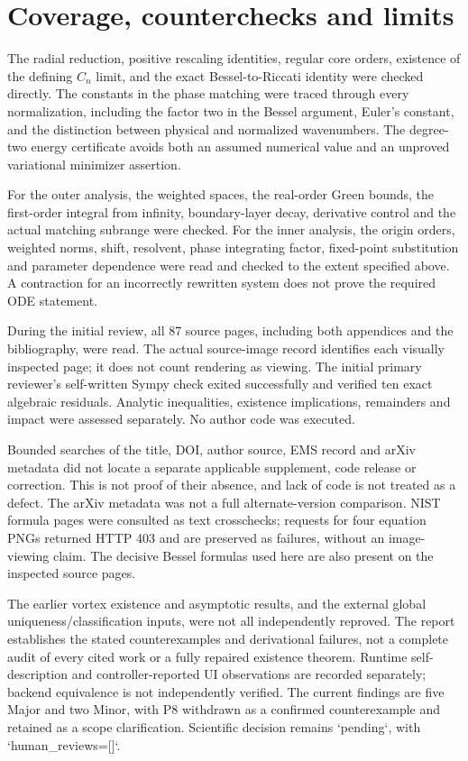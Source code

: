 \documentclass[10pt]{article}
\begin{document}
\section*{Coverage, counterchecks and limits}
The radial reduction, positive rescaling identities, regular core orders, existence of the defining \(C_n\) limit, and the exact Bessel-to-Riccati identity were checked directly. The constants in the phase matching were traced through every normalization, including the factor two in the Bessel argument, Euler’s constant, and the distinction between physical and normalized wavenumbers. The degree-two energy certificate avoids both an assumed numerical value and an unproved variational minimizer assertion.\par
For the outer analysis, the weighted spaces, the real-order Green bounds, the first-order integral from infinity, boundary-layer decay, derivative control and the actual matching subrange were checked. For the inner analysis, the origin orders, weighted norms, shift, resolvent, phase integrating factor, fixed-point substitution and parameter dependence were read and checked to the extent specified above. A contraction for an incorrectly rewritten system does not prove the required ODE statement.\par
During the initial review, all 87 source pages, including both appendices and the bibliography, were read. The actual source-image record identifies each visually inspected page; it does not count rendering as viewing. The initial primary reviewer’s self-written Sympy check exited successfully and verified ten exact algebraic residuals. Analytic inequalities, existence implications, remainders and impact were assessed separately. No author code was executed.\par
Bounded searches of the title, DOI, author source, EMS record and arXiv metadata did not locate a separate applicable supplement, code release or correction. This is not proof of their absence, and lack of code is not treated as a defect. The arXiv metadata was not a full alternate-version comparison. NIST formula pages were consulted as text crosschecks; requests for four equation PNGs returned HTTP 403 and are preserved as failures, without an image-viewing claim. The decisive Bessel formulas used here are also present on the inspected source pages.\par
The earlier vortex existence and asymptotic results, and the external global uniqueness/classification inputs, were not all independently reproved. The report establishes the stated counterexamples and derivational failures, not a complete audit of every cited work or a fully repaired existence theorem. Runtime self-description and controller-reported UI observations are recorded separately; backend equivalence is not independently verified. The current findings are five Major and two Minor, with P8 withdrawn as a confirmed counterexample and retained as a scope clarification. Scientific decision remains `pending`, with `human\_reviews=[]`.\par
\end{document}
